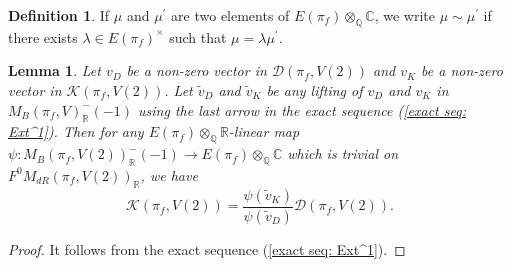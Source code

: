 \documentclass[11pt, a4paper]{amsart}
\theoremstyle{plain}
\newtheorem{lemma}[theorem]{Lemma}
\theoremstyle{definition}
\newtheorem{definition}[theorem]{Definition}
\numberwithin{equation}{section}
\def\CC{\mathbb{C}}
\def\QQ{\mathbb{Q}}
\def\RR{\mathbb{R}}
\begin{document}
\begin{definition}
    If $\mu$ and $\mu^{\prime}$ are two elements of $E(\pi_f)\otimes_{\QQ}{\CC}$, we write $\mu \sim \mu^{\prime}$ if there exists $\lambda \in E(\pi_f)^{\times}$ such that $\mu = \lambda \mu^{\prime}$. 
\end{definition}

\begin{lemma}
\label{Lemma: linear form and rational structure}
    Let ${v}_{D}$ be a non-zero vector in $\mathcal{D}(\pi_f, V(2))$ and $v_{K}$ be a non-zero vector in $\mathcal{K}(\pi_{f}, V(2))$. Let $\tilde{v}_{D}$ and $\tilde{v}_{K}$ be any lifting of $v_{D}$ and $v_{K}$ in $M_{B}(\pi_f, V)^{-}_{\RR}(-1)$ using the last arrow in the exact sequence (\ref{exact seq: Ext^1}). Then for any $E(\pi_{f})\otimes_{\QQ}\RR$-linear map $\psi: M_{B}(\pi_f, V(2))^{-}_{\RR}(-1) \rightarrow E(\pi_f) \otimes_{\QQ} \CC$ which is trivial on $F^{0}M_{dR}(\pi_f, V(2))_{\RR}$, we have 
    \begin{equation*}
        \mathcal{K}(\pi_{f}, V(2)) = \frac{\psi(\tilde{v}_{K})}{\psi(\tilde{v}_{D})} \mathcal{D}(\pi_f, V(2)). 
    \end{equation*}
\end{lemma}

\begin{proof}
    It follows from the exact sequence (\ref{exact seq: Ext^1}).
\end{proof}
\end{document}
